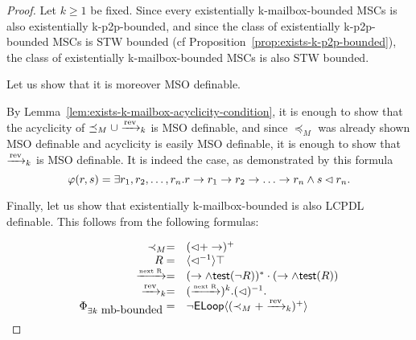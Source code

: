 
\begin{proof}
Let $k\geq 1$ be fixed.
Since every existentially k-mailbox-bounded MSCs is also
existentially k-p2p-bounded, and since the class of existentially k-p2p-bounded MSCs is STW bounded (cf Proposition~\ref{prop:exists-k-p2p-bounded}),
the class of existentially k-mailbox-bounded MSCs is also STW bounded.

Let us show that it is moreover MSO definable.

By Lemma~\ref{lem:exists-k-mailbox-acyclicity-condition}, it is
enough to show that the acyclicity of $\preceq_M\cup\xrightarrow{\tiny\text{rev}}_k$ is
MSO definable, and since $\preceq_M$ was already shown MSO definable
and acyclicity is easily MSO definable, it is enough to show
that $\xrightarrow{\tiny\text{rev}}_k$ is MSO definable. It is indeed the case, as demonstrated by
this formula
$$
\phi(r,s)=\exists r_1,r_2,\dots,r_n. r\procrel r_1\procrel r_2\procrel\dots
\procrel r_n \wedge s\lhd r_n.
$$

Finally, let us show that existentially k-mailbox-bounded is also LCPDL
definable. This follows from the following formulas:

$$
\begin{array}{rl}
\prec_M= & (\lhd+\to)^+
\\
R = & \langle\lhd^{-1}\rangle\top
\\
\xrightarrow{\tiny{\mbox{next R}}} = & (\to\wedge\textsf{test}(\neg R))^*\cdot (\to\wedge \textsf{test}(R))
\\
\xrightarrow{\tiny\text{rev}}_k= & (\xrightarrow{\tiny{\mbox{next R}}})^k.(\lhd)^{-1}.
\\
\Phi_{\exists k~\mbox{mb-bounded}}=&\neg\textsf{E}\textsf{Loop}\langle (\prec_M+\xrightarrow{\tiny\text{rev}}_k)^+ \rangle
\end{array}
$$

\end{proof}
